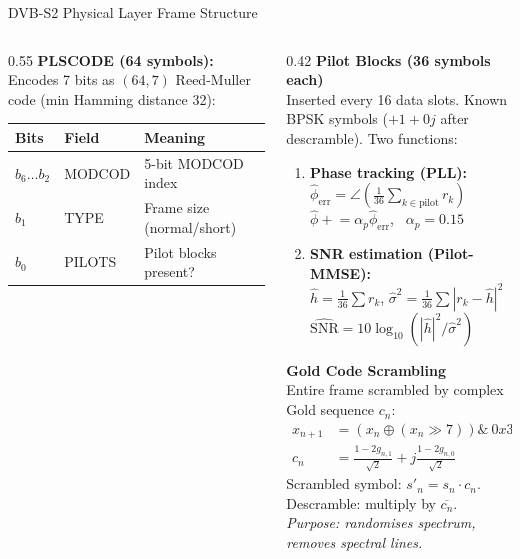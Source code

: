 \documentclass[aspectratio=169,10pt]{beamer}
\begin{document}
\begin{frame}[shrink=18]{DVB-S2 Physical Layer Frame Structure}
\begin{columns}[T]
\begin{column}{0.55\textwidth}
      \vspace{0.3em}
      \textbf{PLSCODE (64 symbols):} Encodes 7 bits as $(64,7)$ Reed-Muller code (min Hamming distance 32):
      \begin{center}{\scriptsize
      \begin{tabular}{lll}
        \toprule
        Bits & Field & Meaning\\
        \midrule
        $b_6\ldots b_2$ & MODCOD & 5-bit MODCOD index\\
        $b_1$ & TYPE & Frame size (normal/short)\\
        $b_0$ & PILOTS & Pilot blocks present?\\
        \bottomrule
      \end{tabular}}
      \end{center}
    \end{column}
    \begin{column}{0.42\textwidth}
      \textbf{Pilot Blocks (36 symbols each)}\\
      \scriptsize Inserted every 16 data slots. Known BPSK symbols ($+1+0j$ after descramble).
      Two functions:
      \begin{enumerate}\scriptsize
        \item \textbf{Phase tracking (PLL):}
        $\hat{\phi}_\text{err} = \angle\!\left(\frac{1}{36}\sum_{k\in\text{pilot}} r_k\right)$\\
        $\hat{\phi} \mathrel{+}= \alpha_p \hat{\phi}_\text{err}$, \ $\alpha_p = 0.15$

        \item \textbf{SNR estimation (Pilot-MMSE):}\\
        $\hat{h} = \tfrac{1}{36}\sum r_k$,\quad
        $\hat{\sigma}^2 = \tfrac{1}{36}\sum |r_k-\hat{h}|^2$\\
        $\widehat{\text{SNR}} = 10\log_{10}(|\hat{h}|^2/\hat{\sigma}^2)$
      \end{enumerate}

      \vspace{0.3em}
      \textbf{Gold Code Scrambling}\\
      \scriptsize Entire frame scrambled by complex Gold sequence $c_n$:\\
      \begin{align*}
        x_{n+1} &= (x_n \oplus (x_n \gg 7)) \&\ 0x3\text{FFFF}\\
        c_n &= \frac{1-2g_{n,1}}{\sqrt{2}} + j\frac{1-2g_{n,0}}{\sqrt{2}}
      \end{align*}
      Scrambled symbol: $s'_n = s_n \cdot c_n$.\\
      Descramble: multiply by $\overline{c_n}$.\\
      \textit{Purpose: randomises spectrum, removes spectral lines.}


\end{column}
\end{columns}
\end{frame}
\end{document}
